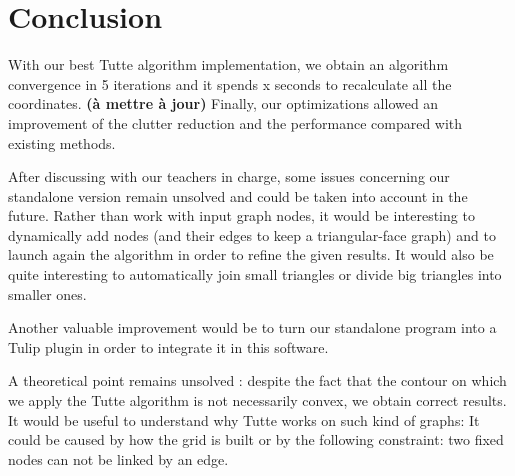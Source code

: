 \chapter*{Conclusion}


With our best Tutte algorithm implementation, we obtain an algorithm convergence in 5 iterations and it spends x seconds to recalculate all the coordinates. \textbf{(à mettre à jour)}
Finally, our optimizations allowed an improvement of the clutter reduction and the performance compared with existing methods.


After discussing with our teachers in charge, some issues concerning our standalone version remain unsolved and could be taken into account in the future. Rather than work with input graph nodes, it would be interesting to dynamically add nodes (and their edges to keep a triangular-face graph) and to launch again the algorithm in order to refine the given results. It would also be quite interesting to automatically join small triangles or divide big triangles into smaller ones.

Another valuable improvement would be to turn our standalone program into a Tulip plugin in order to integrate it in this software.
 
A theoretical point remains unsolved : despite the fact that the contour on which we apply the Tutte algorithm is not necessarily convex, we obtain correct results. It would be useful to understand why Tutte works on such kind of graphs: It could be caused by how the grid is built or by the following constraint: two fixed nodes can not be linked by an edge.


